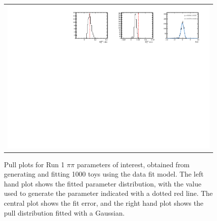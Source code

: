 \begin{figure}
\begin{tabular}{c}
\includegraphics[width=\textwidth]{ANA_resources/Plots/Data_fit/FitterBias//R_ds_pipi_run1.pdf} \\
  \end{tabular}
  \caption{Pull plots for Run 1 $\pi\pi$ parameters of interest, obtained from generating and fitting 1000 toys using the data fit model. The left hand plot shows the fitted parameter distribution, with the value used to generate the parameter indicated with a dotted red line. The central plot shows the fit error, and the right hand plot shows the pull distribution fitted with a Gaussian.}
\label{fig:pipi_run1_pulls}
\end{figure}
